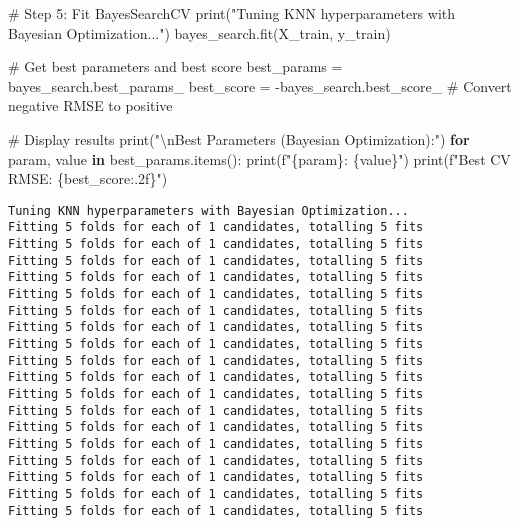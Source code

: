 \documentclass[
  letterpaper,
  DIV=11,
  numbers=noendperiod]{scrreprt}
\newenvironment{Shaded}{\begin{snugshade}}{\end{snugshade}}
\newcommand{\BuiltInTok}[1]{\textcolor[rgb]{0.00,0.23,0.31}{#1}}
\newcommand{\CharTok}[1]{\textcolor[rgb]{0.13,0.47,0.30}{#1}}
\newcommand{\CommentTok}[1]{\textcolor[rgb]{0.37,0.37,0.37}{#1}}
\newcommand{\ControlFlowTok}[1]{\textcolor[rgb]{0.00,0.23,0.31}{\textbf{#1}}}
\newcommand{\KeywordTok}[1]{\textcolor[rgb]{0.00,0.23,0.31}{\textbf{#1}}}
\newcommand{\NormalTok}[1]{\textcolor[rgb]{0.00,0.23,0.31}{#1}}
\newcommand{\OperatorTok}[1]{\textcolor[rgb]{0.37,0.37,0.37}{#1}}
\newcommand{\SpecialCharTok}[1]{\textcolor[rgb]{0.37,0.37,0.37}{#1}}
\newcommand{\SpecialStringTok}[1]{\textcolor[rgb]{0.13,0.47,0.30}{#1}}
\newcommand{\StringTok}[1]{\textcolor[rgb]{0.13,0.47,0.30}{#1}}
\begin{document}
\begin{Shaded}
\begin{Highlighting}[]
\CommentTok{\# Step 5: Fit BayesSearchCV}
\BuiltInTok{print}\NormalTok{(}\StringTok{"Tuning KNN hyperparameters with Bayesian Optimization..."}\NormalTok{)}
\NormalTok{bayes\_search.fit(X\_train, y\_train)}

\CommentTok{\# Get best parameters and best score}
\NormalTok{best\_params }\OperatorTok{=}\NormalTok{ bayes\_search.best\_params\_}
\NormalTok{best\_score }\OperatorTok{=} \OperatorTok{{-}}\NormalTok{bayes\_search.best\_score\_  }\CommentTok{\# Convert negative RMSE to positive}

\CommentTok{\# Display results}
\BuiltInTok{print}\NormalTok{(}\StringTok{"}\CharTok{\textbackslash{}n}\StringTok{Best Parameters (Bayesian Optimization):"}\NormalTok{)}
\ControlFlowTok{for}\NormalTok{ param, value }\KeywordTok{in}\NormalTok{ best\_params.items():}
    \BuiltInTok{print}\NormalTok{(}\SpecialStringTok{f"}\SpecialCharTok{\{}\NormalTok{param}\SpecialCharTok{\}}\SpecialStringTok{: }\SpecialCharTok{\{}\NormalTok{value}\SpecialCharTok{\}}\SpecialStringTok{"}\NormalTok{)}
\BuiltInTok{print}\NormalTok{(}\SpecialStringTok{f"Best CV RMSE: }\SpecialCharTok{\{}\NormalTok{best\_score}\SpecialCharTok{:.2f\}}\SpecialStringTok{"}\NormalTok{)}
\end{Highlighting}
\end{Shaded}

\begin{verbatim}
Tuning KNN hyperparameters with Bayesian Optimization...
Fitting 5 folds for each of 1 candidates, totalling 5 fits
Fitting 5 folds for each of 1 candidates, totalling 5 fits
Fitting 5 folds for each of 1 candidates, totalling 5 fits
Fitting 5 folds for each of 1 candidates, totalling 5 fits
Fitting 5 folds for each of 1 candidates, totalling 5 fits
Fitting 5 folds for each of 1 candidates, totalling 5 fits
Fitting 5 folds for each of 1 candidates, totalling 5 fits
Fitting 5 folds for each of 1 candidates, totalling 5 fits
Fitting 5 folds for each of 1 candidates, totalling 5 fits
Fitting 5 folds for each of 1 candidates, totalling 5 fits
Fitting 5 folds for each of 1 candidates, totalling 5 fits
Fitting 5 folds for each of 1 candidates, totalling 5 fits
Fitting 5 folds for each of 1 candidates, totalling 5 fits
Fitting 5 folds for each of 1 candidates, totalling 5 fits
Fitting 5 folds for each of 1 candidates, totalling 5 fits
Fitting 5 folds for each of 1 candidates, totalling 5 fits
Fitting 5 folds for each of 1 candidates, totalling 5 fits
Fitting 5 folds for each of 1 candidates, totalling 5 fits
\end{verbatim}
\end{document}
